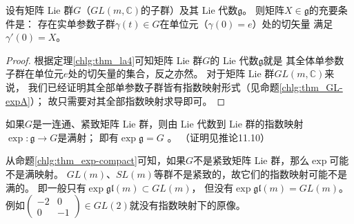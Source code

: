 \begin{proposition}\label{chlg:thm_MatrixG-gexp}
    设有矩阵 Lie 群$G$（$GL(m,\mathbb{C})$的子群）及其 Lie 代数$\mathfrak{g}$。
    则矩阵$X\in \mathfrak{g}$的充要条件是：
    存在实单参数子群$\gamma(t)\in G$在单位元（$\gamma(0)=e$）处的切矢量
    满足$\gamma'(0)=X$。
\end{proposition}
\begin{proof}
根据定理\ref{chlg:thm_la4}可知矩阵 Lie 群$G$的 Lie 代数$\mathfrak{g}$就是
其全体单参数子群在单位元$e$处的切矢量的集合，反之亦然。
对于矩阵 Lie 群$GL(m,\mathbb{C})$来说，
我们已经证明其全部单参数子群皆有指数映射形式（见命题\ref{chlg:thm_GL-expA}）；
故只需要对其全部指数映射求导即可。
\end{proof}


\begin{proposition}\label{chlg:thm_exp-compact}
    如果$G$是一连通、紧致矩阵 Lie 群，则由 Lie 代数到 Lie 群的指数映射$\exp:\mathfrak{g}\to G$是满射；
    即有$\exp \mathfrak{g} = G$ 。
    （证明见\parencite[\S 11.2]{hall-2015}推论11.10）
\end{proposition}

从命题\ref{chlg:thm_exp-compact}可知，如果$G$不是紧致矩阵 Lie 群，那么$\exp$可能不是满映射。
$GL(m)$、$SL(m)$等群不是紧致的，故它们的指数映射可能不是满的。
即一般只有$\exp \mathfrak{gl}(m) \subset GL(m)$，
但没有$\exp \mathfrak{gl}(m) = GL(m)$。
例如$\left(\begin{smallmatrix} -2 & 0\\0 & -1\end{smallmatrix}\right) \in GL(2)$就没有指数映射下的原像。


%    




